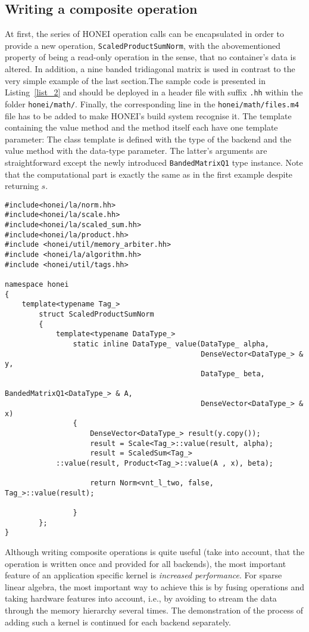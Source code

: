 \documentclass{article}
\begin{document}
\subsection{Writing a composite operation}\label{composite}
At first, the series of HONEI operation calls can be encapsulated in order to provide a new operation, \texttt{ScaledProductSumNorm}, with the abovementioned property of being a read-only operation in the sense, that no container's data is altered. In addition, a nine banded tridiagonal matrix is used in contrast to the very simple example of the last section.The sample code is presented in Listing~\ref{list_2} and should be deployed in a header file with suffix \texttt{.hh} within the folder \texttt{honei/math/}. Finally, the corresponding line in the \texttt{honei/math/files.m4} file has to be added to make HONEI's build system recognise it. The template containing the value method and the method itself each have one template parameter: The class template is defined with the type of the backend and the value method with the data-type parameter. The latter's arguments are straightforward except the newly introduced \texttt{BandedMatrixQ1} type instance. Note that the computational part is exactly the same as in the first example despite returning $s$.

\begin{lstlisting}[float, caption= Developing kernels - A composite kernel, label=list_2]
#include<honei/la/norm.hh>
#include<honei/la/scale.hh>
#include<honei/la/scaled_sum.hh>
#include<honei/la/product.hh>
#include <honei/util/memory_arbiter.hh>
#include <honei/la/algorithm.hh>
#include <honei/util/tags.hh>

namespace honei
{
    template<typename Tag_>
        struct ScaledProductSumNorm
        {
            template<typename DataType_>
                static inline DataType_ value(DataType_ alpha,
                                              DenseVector<DataType_> & y,
                                              DataType_ beta,
                                              BandedMatrixQ1<DataType_> & A,
                                              DenseVector<DataType_> & x)
                {
                    DenseVector<DataType_> result(y.copy());
                    result = Scale<Tag_>::value(result, alpha);
                    result = ScaledSum<Tag_>
			::value(result, Product<Tag_>::value(A , x), beta);

                    return Norm<vnt_l_two, false, Tag_>::value(result);

                }
        };
}
\end{lstlisting}
Although writing composite operations is quite useful (take into account, that the operation is written once and provided for all backends), the most important feature of an application specific kernel is \emph{increased performance}. For sparse linear algebra, the most important way to achieve this is by fusing operations and taking hardware features into account, i.e., by avoiding to stream the data through the memory hierarchy several times. The demonstration of the process of adding such a kernel is continued for each backend separately.
\end{document}
